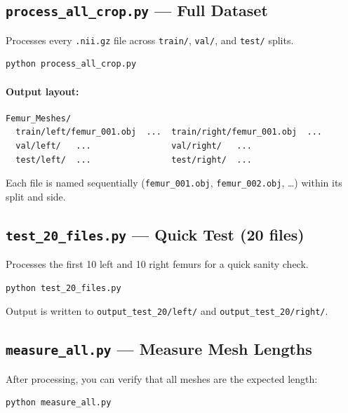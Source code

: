 \documentclass[12pt,a4paper]{article}
\begin{document}
\subsection{\texttt{process\_all\_crop.py} — Full Dataset}

Processes every \texttt{.nii.gz} file across \texttt{train/}, \texttt{val/},
and \texttt{test/} splits.

\begin{lstlisting}[language=bash,style=pythonstyle]
python process_all_crop.py
\end{lstlisting}

\paragraph{Output layout:}
\begin{lstlisting}[language={},basicstyle=\ttfamily\small,frame=single,numbers=none]
Femur_Meshes/
  train/left/femur_001.obj  ...  train/right/femur_001.obj  ...
  val/left/   ...                val/right/   ...
  test/left/  ...                test/right/  ...
\end{lstlisting}

Each file is named sequentially (\texttt{femur\_001.obj},
\texttt{femur\_002.obj}, \ldots) within its split and side.

\subsection{\texttt{test\_20\_files.py} — Quick Test (20 files)}

Processes the first 10 left and 10 right femurs for a quick sanity check.

\begin{lstlisting}[language=bash,style=pythonstyle]
python test_20_files.py
\end{lstlisting}

Output is written to \texttt{output\_test\_20/left/} and
\texttt{output\_test\_20/right/}.

\subsection{\texttt{measure\_all.py} — Measure Mesh Lengths}

After processing, you can verify that all meshes are the expected length:

\begin{lstlisting}[language=bash,style=pythonstyle]
python measure_all.py
\end{lstlisting}
\end{document}
